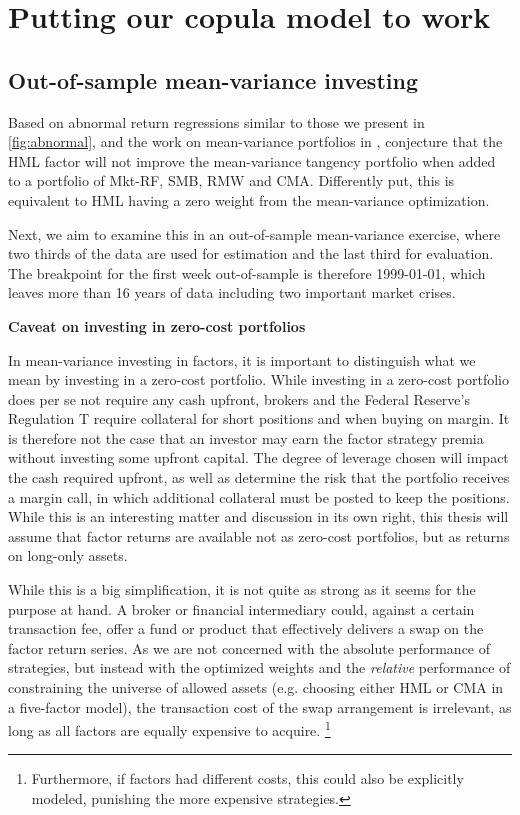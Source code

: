 
\section{Putting our copula model to work}
\label{sec:model_work}



\subsection{Out-of-sample mean-variance investing}
\label{subsec:mean_variance}

Based on abnormal return regressions similar to those we present in \autoref{fig:abnormal}, and the work on mean-variance portfolios in \textcite{HubermanKandel1987}, \textcite{FF2015} conjecture that the HML factor will not improve the mean-variance tangency portfolio when added to a portfolio of Mkt-RF, SMB, RMW and CMA. Differently put, this is equivalent to HML having a zero weight from the mean-variance optimization. 

Next, we aim to examine this in an out-of-sample mean-variance exercise, where two thirds of the data are used for estimation and the last third for evaluation. The breakpoint for the first week out-of-sample is therefore 1999-01-01, which leaves more than 16 years of data including two important market crises.

\textbf{Caveat on investing in zero-cost portfolios}

In mean-variance investing in factors, it is important to distinguish what we mean by investing in a zero-cost portfolio. While investing in a zero-cost portfolio does per se not require any cash upfront, brokers and the Federal Reserve's Regulation T require collateral for short positions and when buying on margin. It is therefore not the case that an investor may earn the factor strategy premia without investing some upfront capital. The degree of leverage chosen will impact the cash required upfront, as well as determine the risk that the portfolio receives a margin call, in which additional collateral must be posted to keep the positions. While this is an interesting matter and discussion in its own right, this thesis will assume that factor returns are available not as zero-cost portfolios, but as returns on long-only assets.

While this is a big simplification, it is not quite as strong as it seems for the purpose at hand. A broker or financial intermediary could, against a certain transaction fee, offer a fund or product that effectively delivers a swap on the factor return series. As we are not concerned with the absolute performance of strategies, but instead with the optimized weights and the \emph{relative} performance of constraining the universe of allowed assets (e.g. choosing either HML or CMA in a five-factor model), the transaction cost of the swap arrangement is irrelevant, as long as all factors are equally expensive to acquire. \footnote{Furthermore, if factors had different costs, this could also be explicitly modeled, punishing the more expensive strategies.}

